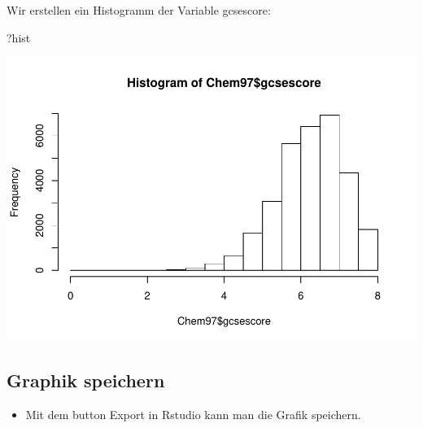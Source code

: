 \documentclass[]{article}
\newenvironment{Shaded}{\begin{snugshade}}{\end{snugshade}}
\newcommand{\KeywordTok}[1]{\textcolor[rgb]{0.13,0.29,0.53}{\textbf{{#1}}}}
\newcommand{\NormalTok}[1]{{#1}}
\providecommand{\tightlist}{%
  \setlength{\itemsep}{0pt}\setlength{\parskip}{0pt}}
\begin{document}
Wir erstellen ein Histogramm der Variable gcsescore:

\begin{Shaded}
\begin{Highlighting}[]
\NormalTok{?hist}
\end{Highlighting}
\end{Shaded}

\begin{Shaded}
\end{Shaded}

\includegraphics{Intro_Datenanalyse1_files/figure-latex/unnamed-chunk-140-1.pdf}

\subsection{Graphik speichern}\label{graphik-speichern}

\begin{itemize}
\tightlist
\item
  Mit dem button Export in Rstudio kann man die Grafik speichern.
\end{itemize}
\end{document}
